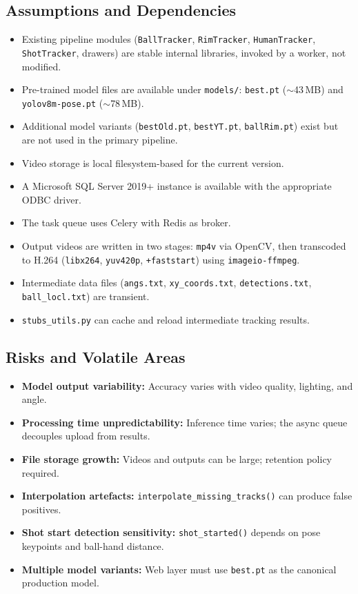 ﻿\documentclass[11pt,a4paper]{article}
\begin{document}
\subsection{Assumptions and Dependencies}
\begin{itemize}[leftmargin=*]
    \item Existing pipeline modules (\texttt{BallTracker}, \texttt{RimTracker}, \texttt{HumanTracker}, \texttt{ShotTracker}, drawers) are stable internal libraries, invoked by a worker, not modified.
    \item Pre-trained model files are available under \texttt{models/}: \texttt{best.pt} ($\sim$43\,MB) and \texttt{yolov8m-pose.pt} ($\sim$78\,MB).
    \item Additional model variants (\texttt{bestOld.pt}, \texttt{bestYT.pt}, \texttt{ballRim.pt}) exist but are not used in the primary pipeline.
    \item Video storage is local filesystem-based for the current version.
    \item A Microsoft SQL Server 2019+ instance is available with the appropriate ODBC driver.
    \item The task queue uses Celery with Redis as broker.
    \item Output videos are written in two stages: \texttt{mp4v} via OpenCV, then transcoded to H.264 (\texttt{libx264}, \texttt{yuv420p}, \texttt{+faststart}) using \texttt{imageio-ffmpeg}.
    \item Intermediate data files (\texttt{angs.txt}, \texttt{xy\_coords.txt}, \texttt{detections.txt}, \texttt{ball\_locl.txt}) are transient.
    \item \texttt{stubs\_utils.py} can cache and reload intermediate tracking results.
\end{itemize}

\subsection{Risks and Volatile Areas}
\begin{itemize}[leftmargin=*]
    \item \textbf{Model output variability:} Accuracy varies with video quality, lighting, and angle.
    \item \textbf{Processing time unpredictability:} Inference time varies; the async queue decouples upload from results.
    \item \textbf{File storage growth:} Videos and outputs can be large; retention policy required.
    \item \textbf{Interpolation artefacts:} \texttt{interpolate\_missing\_tracks()} can produce false positives.
    \item \textbf{Shot start detection sensitivity:} \texttt{shot\_started()} depends on pose keypoints and ball-hand distance.
    \item \textbf{Multiple model variants:} Web layer must use \texttt{best.pt} as the canonical production model.
\end{itemize}
\end{document}
